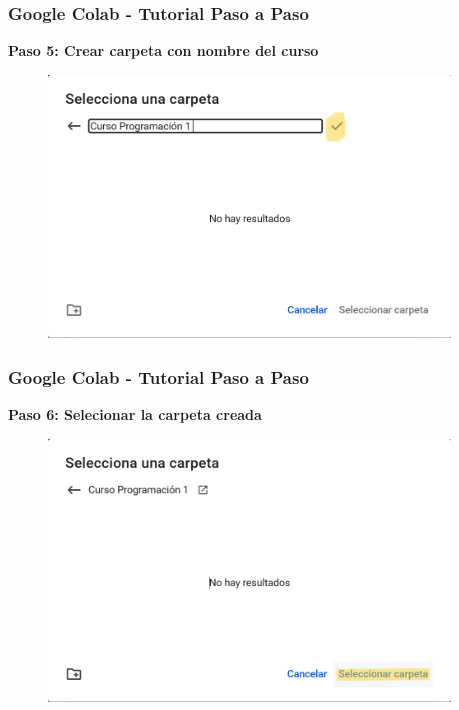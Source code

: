 \documentclass[10pt]{beamer}
\begin{document}
\begin{frame}
  \frametitle{Google Colab - Tutorial Paso a Paso}
  \begin{center}
    \textbf{Paso 5: Crear carpeta con nombre del curso}
  \end{center}
  \begin{figure}
    \includegraphics[width=0.95\textwidth]{2) Colab/GColab05.png}
  \end{figure}
\end{frame}

\begin{frame}
  \frametitle{Google Colab - Tutorial Paso a Paso}
  \begin{center}
    \textbf{Paso 6: Selecionar la carpeta creada}
  \end{center}
  \begin{figure}
    \includegraphics[width=0.95\textwidth]{2) Colab/GColab06.png}
  \end{figure}
\end{frame}
\end{document}
